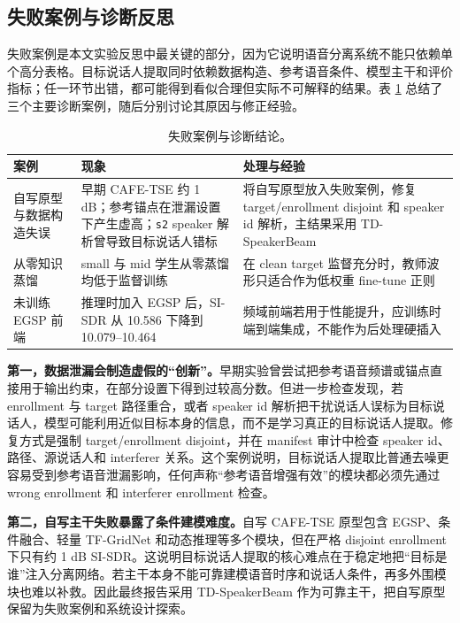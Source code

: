 \documentclass[UTF8,zihao=5,a4paper]{ctexart}
\newcommand{\sisdr}{SI-SDR}
\begin{document}
\subsection{失败案例与诊断反思}

失败案例是本文实验反思中最关键的部分，因为它说明语音分离系统不能只依赖单个高分表格。目标说话人提取同时依赖数据构造、参考语音条件、模型主干和评价指标；任一环节出错，都可能得到看似合理但实际不可解释的结果。表 \ref{tab:failure} 总结了三个主要诊断案例，随后分别讨论其原因与修正经验。

\begin{table}[H]
\centering
\begin{tabular}{p{3.2cm}p{5.0cm}p{5.2cm}}
\toprule
案例 & 现象 & 处理与经验 \\
\midrule
自写原型与数据构造失误 & 早期 CAFE-TSE 约 1 dB；参考锚点在泄漏设置下产生虚高；\texttt{s2} speaker 解析曾导致目标说话人错标 & 将自写原型放入失败案例，修复 target/enrollment disjoint 和 speaker id 解析，主结果采用 TD-SpeakerBeam \\
从零知识蒸馏 & small 与 mid 学生从零蒸馏均低于监督训练 & 在 clean target 监督充分时，教师波形只适合作为低权重 fine-tune 正则 \\
未训练 EGSP 前端 & 推理时加入 EGSP 后，\sisdr{} 从 10.586 下降到 10.079--10.464 & 频域前端若用于性能提升，应训练时端到端集成，不能作为后处理硬插入 \\
\bottomrule
\end{tabular}
\caption{失败案例与诊断结论。}
\label{tab:failure}
\end{table}

\textbf{第一，数据泄漏会制造虚假的“创新”。}早期实验曾尝试把参考语音频谱或锚点直接用于输出约束，在部分设置下得到过较高分数。但进一步检查发现，若 enrollment 与 target 路径重合，或者 speaker id 解析把干扰说话人误标为目标说话人，模型可能利用近似目标本身的信息，而不是学习真正的目标说话人提取。修复方式是强制 target/enrollment disjoint，并在 manifest 审计中检查 speaker id、路径、源说话人和 interferer 关系。这个案例说明，目标说话人提取比普通去噪更容易受到参考语音泄漏影响，任何声称“参考语音增强有效”的模块都必须先通过 wrong enrollment 和 interferer enrollment 检查。

\textbf{第二，自写主干失败暴露了条件建模难度。}自写 CAFE-TSE 原型包含 EGSP、条件融合、轻量 TF-GridNet 和动态推理等多个模块，但在严格 disjoint enrollment 下只有约 1 dB \sisdr{}。这说明目标说话人提取的核心难点在于稳定地把“目标是谁”注入分离网络。若主干本身不能可靠建模语音时序和说话人条件，再多外围模块也难以补救。因此最终报告采用 TD-SpeakerBeam 作为可靠主干，把自写原型保留为失败案例和系统设计探索。
\end{document}
